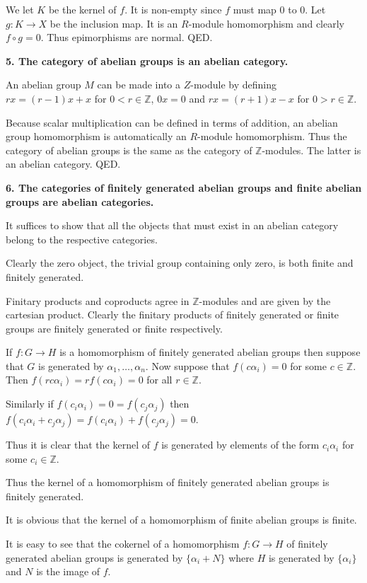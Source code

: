 \documentclass[12pt]{article}
\newcommand{\Z}{\mathbb{Z}}
\begin{document}
We let $K$ be the kernel of $f$. It is non-empty since $f$ must map $0$ to $0$. Let $g : K \to X$ be the inclusion map. It is an $R$-module homomorphism and clearly $f\circ g = 0$. Thus epimorphisms are normal. QED.

\textbf{5. The category of abelian groups is an abelian category.}

An abelian group $M$ can be made into a $Z$-module by defining $rx = (r - 1)x + x$ for $0 < r \in \Z$, $0x = 0$ and $rx = (r + 1)x - x$ for $0 > r \in \Z$.

Because scalar multiplication can be defined in terms of addition, an abelian group homomorphism is automatically an $R$-module homomorphism. Thus the category of abelian groups is the same as the category of $\Z$-modules. The latter is an abelian category. QED.

\textbf{6. The categories of finitely generated abelian groups and finite abelian groups are abelian categories.}

It suffices to show that all the objects that must exist in an abelian category belong to the respective categories. 

Clearly the zero object, the trivial group containing only zero, is both finite and finitely generated.

Finitary products and coproducts agree in $\Z$-modules and are given by the cartesian product. Clearly the finitary products of finitely generated or finite groups are finitely generated or finite respectively.

If $f : G \to H$ is a homomorphism of finitely generated abelian groups then suppose that $G$ is generated by $\alpha_1, \ldots, \alpha_n$. Now suppose that $f(c\alpha_i) = 0$ for some $c \in \Z$. Then $f(rc\alpha_i) = rf(c\alpha_i) = 0$ for all $r \in \Z$.

Similarly if $f(c_i\alpha_i) = 0 = f(c_j\alpha_j)$ then $f(c_i\alpha_i + c_j\alpha_j) = f(c_i\alpha_i) + f(c_j\alpha_j) = 0$.

Thus it is clear that the kernel of $f$ is generated by elements of the form $c_i\alpha_i$ for some $c_i \in \Z$.

Thus the kernel of a homomorphism of finitely generated abelian groups is finitely generated.

It is obvious that the kernel of a homomorphism of finite abelian groups is finite.

It is easy to see that the cokernel of a homomorphism $f : G \to H$ of finitely generated abelian groups is generated by $\{\alpha_i + N\}$ where $H$ is generated by $\{\alpha_i\}$ and $N$ is the image of $f$.
\end{document}
